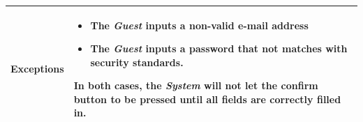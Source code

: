 \begin{table}[ht]
\begin{tabular}{|l|p{}|}
\textbf{Exceptions} &    \begin{itemize}
    \item The \textit{Guest} inputs a non-valid e-mail address
    \item The \textit{Guest} inputs a password that not matches with security standards. 
    \end{itemize} 
  In both cases, the \textit{System} will not let the confirm button to be pressed until all fields are correctly filled in.
                                                                            \\ \hline
\end{tabular}
\end{table}







